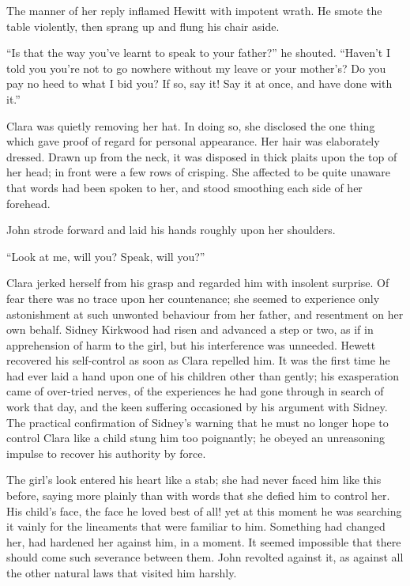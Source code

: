 The manner of her reply inflamed Hewitt with impotent wrath. He smote
the table violently, then sprang up and flung his chair aside.

{}``Is that the way you've learnt to speak to your father?'' he shouted.
``Haven't I told you you're not to go nowhere without my leave or your
mother's? Do you pay no heed to what I bid you? If so, say it! Say it at
once, and have done with it.''

Clara was quietly removing her hat. In doing so, she disclosed the one
thing which gave proof of regard for personal appearance. Her hair was
elaborately dressed. Drawn up from the neck, it was disposed in thick
plaits upon the top of her head; in front were a few rows of crisping.
She affected to be quite unaware that words had been spoken to her, and
stood smoothing each side of her forehead.

John strode forward and laid his hands roughly upon her shoulders.

``Look at me, will you? Speak, will you?''

Clara jerked herself from his grasp and regarded him with insolent
surprise. Of fear there was no trace upon her countenance; she seemed to
experience only astonishment {}at such unwonted behaviour from her
father, and resentment on her own behalf. Sidney Kirkwood had risen and
advanced a step or two, as if in apprehension of harm to the girl, but
his interference was unneeded. Hewett recovered his self-control as soon
as Clara repelled him. It was the first time he had ever laid a hand
upon one of his children other than gently; his exasperation came of
over-tried nerves, of the experiences he had gone through in search of
work that day, and the keen suffering occasioned by his argument with
Sidney. The practical confirmation of Sidney's warning that he must no
longer hope to control Clara like a child stung him too poignantly; he
obeyed an unreasoning impulse to recover his authority by force.

The girl's look entered his heart like a stab; she had never faced him
like this before, saying more plainly than with words that she defied
him to control her. His child's face, the face he loved best of all! yet
at this moment he was searching it vainly {}for the lineaments that were
familiar to him. Something had changed her, had hardened her against
him, in a moment. It seemed impossible that there should come such
severance between them. John revolted against it, as against all the
other natural laws that visited him harshly.

